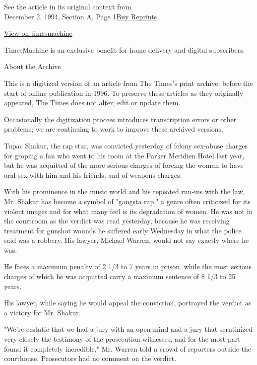 See the article in its original context from\\
December 2, 1994, Section A, Page
1\href{https://store.nytimes3xbfgragh.onion/collections/new-york-times-page-reprints?utm_source=nytimes\&utm_medium=article-page\&utm_campaign=reprints}{Buy
Reprints}

\href{http://timesmachine.nytimes3xbfgragh.onion/timesmachine/1994/12/02/984868.html}{View
on timesmachine}

TimesMachine is an exclusive benefit for home delivery and digital
subscribers.

About the Archive

This is a digitized version of an article from The Times's print
archive, before the start of online publication in 1996. To preserve
these articles as they originally appeared, The Times does not alter,
edit or update them.

Occasionally the digitization process introduces transcription errors or
other problems; we are continuing to work to improve these archived
versions.

Tupac Shakur, the rap star, was convicted yesterday of felony sex-abuse
charges for groping a fan who went to his room at the Parker Meridien
Hotel last year, but he was acquitted of the more serious charges of
forcing the woman to have oral sex with him and his friends, and of
weapons charges.

With his prominence in the music world and his repeated run-ins with the
law, Mr. Shakur has become a symbol of "gangsta rap," a genre often
criticized for its violent images and for what many feel is its
degradation of women. He was not in the courtroom as the verdict was
read yesterday, because he was receiving treatment for gunshot wounds he
suffered early Wednesday in what the police said was a robbery. His
lawyer, Michael Warren, would not say exactly where he was.

He faces a maximum penalty of 2 1/3 to 7 years in prison, while the most
serious charges of which he was acquitted carry a maximum sentence of 8
1/3 to 25 years.

His lawyer, while saying he would appeal the conviction, portrayed the
verdict as a victory for Mr. Shakur.

"We're ecstatic that we had a jury with an open mind and a jury that
scrutinized very closely the testimony of the prosecution witnesses, and
for the most part found it completely incredible," Mr. Warren told a
crowd of reporters outside the courthouse. Prosecutors had no comment on
the verdict.

